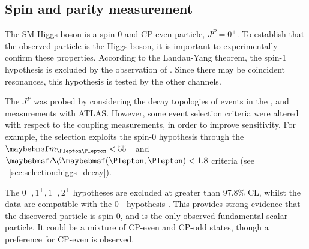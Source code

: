 \subsection{Spin and parity measurement}
\label{sec:searches:spin}

The SM Higgs boson is a spin-0 and CP-even particle, \ie $J^P = 0^+$. To establish that 
the observed particle is the Higgs boson, it is important to experimentally confirm these 
properties. According to the Landau-Yang theorem, the spin-1 hypothesis is excluded by 
the observation of \HepProcess{\PHiggs \HepTo \Pphoton\Pphoton} 
\cite{Landau:1948,Yang:1950}. Since there may be coincident resonances, this hypothesis is 
tested by the other channels.

The $J^P$ was probed by considering the decay topologies of events in the 
\HepProcess{\PHiggs \HepTo \PZ\PZ}, \HWW and \HepProcess{\PHiggs \HepTo \Pphoton\Pphoton} 
measurements with ATLAS. However, some event selection criteria were altered with respect 
to the coupling measurements, in order to improve sensitivity. For example, the \HWW 
selection exploits the spin-0 hypothesis through the \unit{$\mll < 55$}{\GeV} and 
$\dphill < 1.8$ criteria (see \Section~\ref{sec:selection:higgs_decay}).

The $0^-, 1^+, 1^-, 2^+$ hypotheses are excluded at greater than 97.8\% CL, whilst the 
data are compatible with the $0^+$ hypothesis \cite{ATLAS:spin}. This provides strong 
evidence that the discovered particle is spin-0, and is the only observed fundamental 
scalar particle. It could be a mixture of CP-even and CP-odd states, though a preference 
for CP-even is observed.


